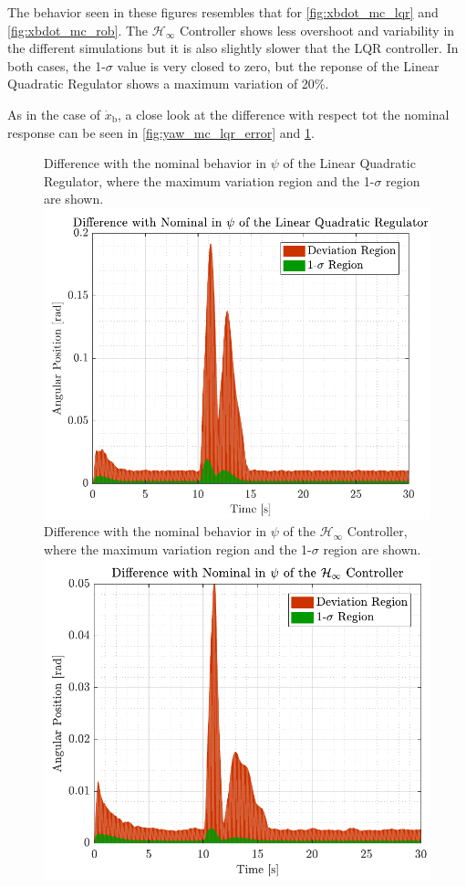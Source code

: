 The behavior seen in these figures resembles that for \autoref{fig:xbdot_mc_lqr} and \ref{fig:xbdot_mc_rob}. The $\mathcal{H}_\infty$ Controller shows less overshoot and variability in the different simulations but it is also slightly slower that the LQR controller. In both cases, the 1-$\sigma$ value is very closed to zero, but the reponse of the Linear Quadratic Regulator shows a maximum variation of 20\%.

As in the case of $\dot{x}_\mathrm{b}$, a close look at the difference with respect tot the nominal response can be seen in \autoref{fig:yaw_mc_lqr_error} and \ref{fig:yaw_mc_rob_error}.
\begin{figure}[H]
    \captionbox 
    {   
        Difference with the nominal behavior in $\psi$ of the Linear Quadratic Regulator, where the maximum variation region and the 1-$\sigma$ region are shown.
        \label{fig:yaw_mc_lqr_error}
    }                                                                 
    {                                                                  
        \includegraphics[width=.45\textwidth]{figures/yaw_mc_lqr_error}         
    }                                                                    
    \hspace{5pt}                                                          
    \captionbox  
    {   
        Difference with the nominal behavior in $\psi$ of the $\mathcal{H}_\infty$ Controller, where the maximum variation region and the 1-$\sigma$ region are shown.   
        \label{fig:yaw_mc_rob_error}
    }                                                                          
    {
        \includegraphics[width=.45\textwidth]{figures/yaw_mc_rob_error}
    }
\end{figure}

